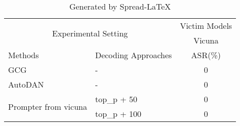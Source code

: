 \begin{table}[H]\centering
\caption{Generated by Spread-LaTeX}\label{tab: }
\scriptsize
\begin{tabular}{llc}\toprule
\multicolumn{2}{c}{\multirow{2}{*}{Experimental Setting}} &\multicolumn{1}{c}{Victim Models} \\
\cmidrule{3-3}
& & Vicuna\\
\midrule
Methods & Decoding Approaches  & ASR(\%)\\
\midrule
GCG & - & 0 \\ %
\cmidrule{1-3}
AutoDAN & - & 0 \\ %
\cmidrule{1-3} %
\multirow{2}{*}{Prompter from vicuna} &top\_p + 50 &0 \\
&top\_p + 100 &0 \\
\bottomrule
\end{tabular}
\end{table}

